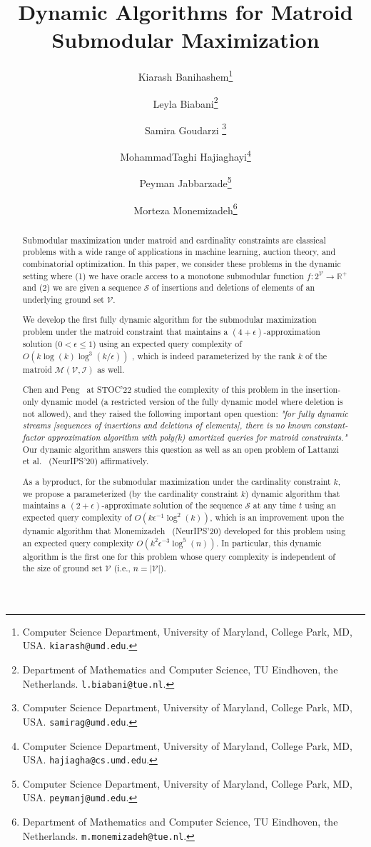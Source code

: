 \documentclass[11pt]{article}
\title{
\Large
Dynamic Algorithms for  Matroid Submodular Maximization }
\author{ 
Kiarash Banihashem\thanks{Computer Science Department, University of Maryland, College Park, MD, USA. {\tt kiarash@umd.edu}.}
\and
Leyla Biabani\thanks{Department of Mathematics and Computer Science, TU Eindhoven, the Netherlands. {\tt l.biabani@tue.nl}.}
\and
Samira Goudarzi \thanks{Computer Science Department, University of Maryland, College Park, MD, USA. {\tt samirag@umd.edu}. }
\and
MohammadTaghi Hajiaghayi\thanks{Computer Science Department, University of Maryland, College Park, MD, USA. {\tt hajiagha@cs.umd.edu}.}
\and
Peyman Jabbarzade\thanks{Computer Science Department, University of Maryland, College Park, MD, USA. {\tt peymanj@umd.edu}.}
\and
Morteza Monemizadeh\thanks{Department of Mathematics and Computer Science, TU Eindhoven, the Netherlands. {\tt m.monemizadeh@tue.nl}.}
}
\date{\vspace{-5ex}}
\newcommand{\mO}{O}
\newcommand{\matroid}{\mathcal{M}(\ground,\mathcal{I})}
\newcommand{\ground}{\ensuremath{\mathcal{V}}}
\begin{document}
\maketitle

\begin{abstract}

Submodular maximization under matroid and cardinality  
constraints are classical problems with a wide range of applications in machine learning, 
auction theory, and combinatorial optimization. 
In this paper, we consider these problems in the dynamic setting where 
(1) we have oracle access to a monotone submodular function $f: 2^{\ground} \rightarrow \mathbb{R}^+$ and 
(2) we are given a sequence $\mathcal{S}$ of insertions and deletions of elements of an underlying ground set $\ground$.

We develop the first fully dynamic algorithm for the submodular maximization problem under the matroid constraint that maintains a $(4+\epsilon)$-approximation solution ($0 < \epsilon \le 1$) using an expected query complexity of $O(k\log(k)\log^3{(k/\epsilon)})$ 
, which is indeed parameterized by the rank $k$ of the matroid $\matroid$ as well. 


Chen and Peng~\cite{DBLP:journals/corr/abs-2111-03198} at STOC'22 
studied the complexity of this problem in the insertion-only dynamic model (a restricted version of the fully dynamic model 
where deletion is not allowed), and they raised the following important open question: 
\emph{"for fully dynamic streams [sequences of 
insertions and deletions of elements], there is no known constant-factor approximation 
algorithm with poly(k) amortized queries for matroid constraints." }
Our dynamic algorithm answers this question as well as an open problem of Lattanzi et al.~\cite{DBLP:conf/nips/LattanziMNTZ20} (NeurIPS'20) affirmatively. 

As a byproduct, for the submodular maximization under the cardinality  constraint $k$, 
we propose a parameterized (by the cardinality constraint $k$) dynamic algorithm that maintains a $(2+\epsilon)$-approximate solution of the sequence $\mathcal{S}$ at any time $t$ using an expected query complexity of $\mO(k\epsilon^{-1}\log^2(k))$, which is an improvement upon the dynamic algorithm that Monemizadeh~\cite{DBLP:conf/nips/Monemizadeh20} (NeurIPS'20) 
developed for this problem using an expected query complexity $O(k^2\epsilon^{-3}\log^5(n))$. 
In particular, this dynamic algorithm is the first one for this problem whose query complexity is independent of the size of ground set $\ground$ (i.e., $n = |\ground|$). 


\end{abstract}
\end{document}
